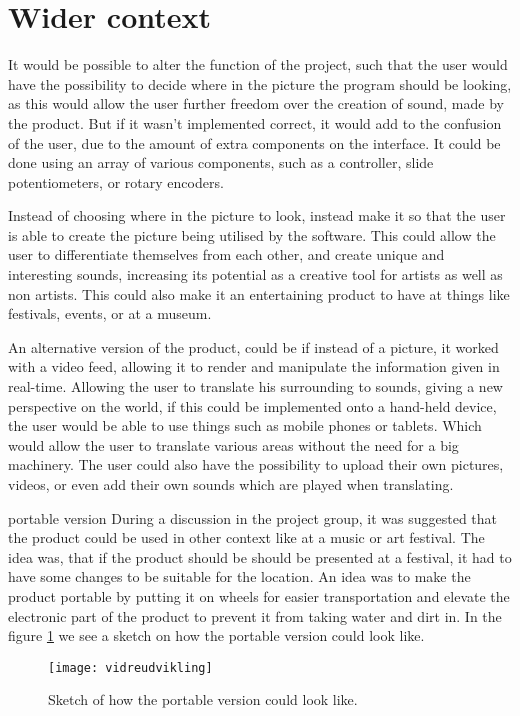  
\section{Wider context}
It would be possible to alter the function of the project, such that the user would have the possibility to decide where in the picture the program should be looking, as this would allow the user further freedom over the creation of sound, made by the product. But if it wasn't implemented correct, it would add to the confusion of the user, due to the amount of extra components on the interface. It could be done using an array of various components, such as a controller, slide potentiometers, or rotary encoders. 

Instead of choosing where in the picture to look, instead make it so that the user is able to create the picture being utilised by the software. This could allow the user to differentiate themselves from each other, and create unique and interesting sounds, increasing its potential as a creative tool for artists as well as non artists. This could also make it an entertaining product to have at things like festivals, events, or at a museum. 

An alternative version of the product, could be if instead of a picture, it worked with a video feed, allowing it to render and manipulate the information given in real-time. Allowing the user to translate his surrounding to sounds, giving a new perspective on the world, if this could be implemented onto a hand-held device, the user would be able to use things such as mobile phones or tablets. Which would allow the user to translate various areas without the need for a big machinery. 
The user could also have the possibility to upload their own pictures, videos, or even add their own sounds which are played when translating. 

portable version
During a discussion in the project group, it was suggested that the product could be used in other context like at a music or art festival. The idea was, that if the product should be should be presented at a festival, it had to have some changes to be suitable for the location. An idea was to make the product portable by putting it on wheels for easier transportation and elevate the electronic part of the product to prevent it from taking water and dirt in. In the figure \ref{fig:vidreudvikling} we see a sketch on how the portable version could look like. 

\begin{figure}[!h] 
\centering
\texttt{[image: vidreudvikling]}
\caption{\label{fig:vidreudvikling} Sketch of how the portable version could look like.}
\end{figure}



